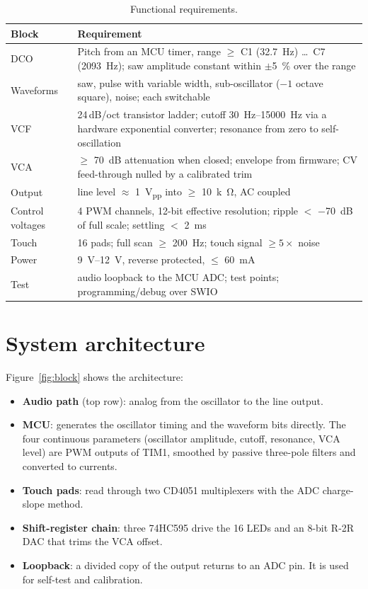 \documentclass[11pt,a4paper]{article}
\begin{document}
\begin{table}[h]
\centering\small
\caption{Functional requirements.}\label{tab:req}
\begin{tabularx}{\textwidth}{@{}l X@{}}
\toprule
Block & Requirement \\
\midrule
DCO & Pitch from an MCU timer, range $\geq$ C1 (\SI{32.7}{Hz}) \ldots\ C7 (\SI{2093}{Hz}); saw amplitude
constant within $\pm$\SI{5}{\percent} over the range \\
Waveforms & saw, pulse with variable width, sub-oscillator ($-1$ octave square), noise; each switchable \\
VCF & 24\,dB/oct transistor ladder; cutoff \SIrange{30}{15000}{Hz} via a hardware exponential converter;
resonance from zero to self-oscillation \\
VCA & $\geq$ \SI{70}{dB} attenuation when closed; envelope from firmware; CV feed-through nulled by a
calibrated trim \\
Output & line level $\approx$ \SI{1}{V_{pp}} into $\geq$ \SI{10}{k\ohm}, AC coupled \\
Control voltages & 4 PWM channels, 12-bit effective resolution; ripple $<$ \SI{-70}{dB} of full scale;
settling $<$ \SI{2}{ms} \\
Touch & 16 pads; full scan $\geq$ \SI{200}{Hz}; touch signal $\geq 5\times$ noise \\
Power & \SIrange{9}{12}{V}, reverse protected, $\leq$ \SI{60}{mA} \\
Test & audio loopback to the MCU ADC; test points; programming/debug over SWIO \\
\bottomrule
\end{tabularx}
\end{table}

\section{System architecture}

Figure~\ref{fig:block} shows the architecture:
\begin{itemize}
  \item \textbf{Audio path} (top row): analog from the oscillator to the line output.
  \item \textbf{MCU}: generates the oscillator timing and the waveform bits directly. The four continuous
    parameters (oscillator amplitude, cutoff, resonance, VCA level) are PWM outputs of TIM1, smoothed by
    passive three-pole filters and converted to currents.
  \item \textbf{Touch pads}: read through two CD4051 multiplexers with the ADC charge-slope method.
  \item \textbf{Shift-register chain}: three 74HC595 drive the 16 LEDs and an 8-bit R-2R DAC that trims
    the VCA offset.
  \item \textbf{Loopback}: a divided copy of the output returns to an ADC pin. It is used for
    self-test and calibration.
\end{itemize}
\end{document}
